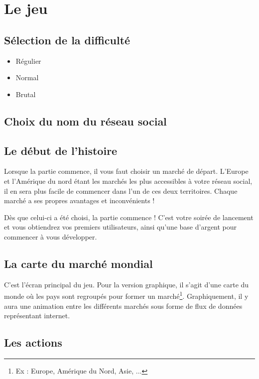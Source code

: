 \section{Le jeu}

\subsection{Sélection de la difficulté}
\begin{itemize}
    \item Régulier
    \item Normal
    \item Brutal
\end{itemize}
\subsection{Choix du nom du réseau social}
\subsection{Le début de l'histoire}
Lorsque la partie commence, il vous faut choisir un marché de départ. L'Europe et l'Amérique du nord étant les marchés les plus accessibles à votre réseau social, il en sera plus facile de commencer dans l'un de ces deux territoires. Chaque marché a ses propres avantages et inconvénients !

Dès que celui-ci a été choisi, la partie commence ! C'est votre soirée de lancement et vous obtiendrez vos premiers utilisateurs, ainsi qu'une base d'argent pour commencer à vous développer.

\subsection{La carte du marché mondial}
C'est l'écran principal du jeu. Pour la version graphique, il s'agit d'une carte du monde où les pays sont regroupés pour former un marché\footnote{Ex : Europe, Amérique du Nord, Asie, ...}. Graphiquement, il y aura une animation entre les différents marchés sous forme de flux de données représentant internet.



\subsection{Les actions}
